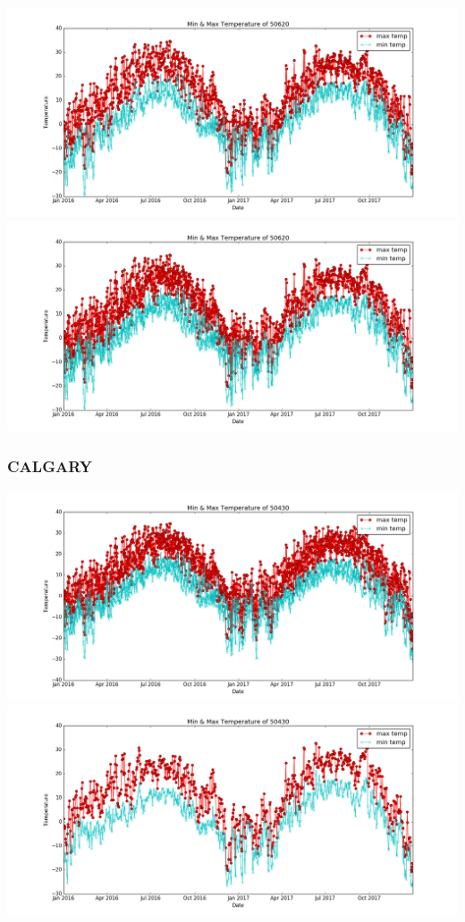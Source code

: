 \documentclass{article}
\begin{document}
\includegraphics[scale=0.35]{./Plots/50620-2017_minmax.png}\\

\includegraphics[scale=0.35]{./Plots/50620-2016_minmax.png}\\

\subsubsection{CALGARY}

\includegraphics[scale=0.35]{./Plots/50430-2017_minmax.png}\\

\includegraphics[scale=0.35]{./Plots/50430-2016_minmax.png}\\
\end{document}
